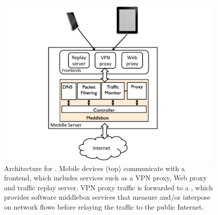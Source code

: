 \begin{figure}[tb]
\centering
\includegraphics[width=0.8\columnwidth]{figures/meddle-diagram.pdf}
\caption{Architecture for \meddle. Mobile devices (top) communicate with 
a \meddle frontend, which includes services such as a VPN proxy, Web proxy and 
traffic replay server. VPN proxy traffic is forwarded to a \meddlebox, which provides 
software middlebox services that measure and/or interpose on network flows before 
relaying the traffic to the public Internet.  }
\label{fig:architecture}
\end{figure}


